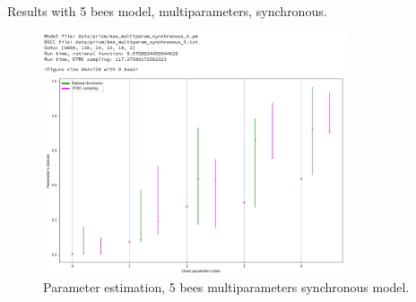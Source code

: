 \documentclass[12pt]{article}
\theoremstyle{definition}
\begin{document}
Results with 5 bees model, multiparameters, synchronous.
\begin{figure}[H]
  \centering
  \includegraphics[width=0.8\textwidth,keepaspectratio]{figures/normal_5.png}
  \caption{Parameter estimation, 5 bees multiparameters synchronous model.}
\end{figure}
\end{document}
